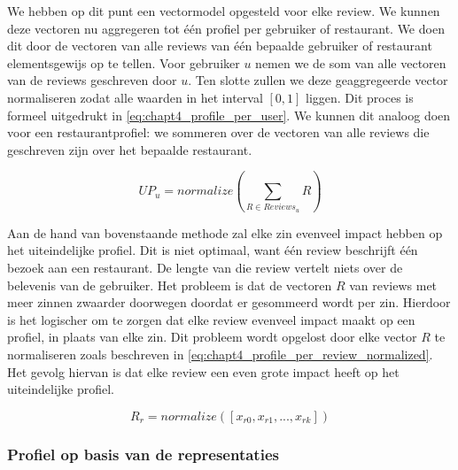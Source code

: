 We hebben op dit punt een vectormodel opgesteld voor elke review. We kunnen deze vectoren nu aggregeren tot één profiel per gebruiker of restaurant. We doen dit door de vectoren van alle reviews van één bepaalde gebruiker of restaurant elementsgewijs op te tellen. Voor gebruiker $u$ nemen we de som van alle vectoren van de reviews geschreven door $u$. Ten slotte zullen we deze geaggregeerde vector normaliseren zodat alle waarden in het interval $[0, 1]$ liggen. Dit proces is formeel uitgedrukt in \autoref{eq:chapt4_profile_per_user}. We kunnen dit analoog doen voor een restaurantprofiel: we sommeren over de vectoren van alle reviews die geschreven zijn over het bepaalde restaurant.

\begin{equation}
\label{eq:chapt4_profile_per_user}
    UP_{u} = normalize(\sum_{R \in Reviews_u}R)
\end{equation}

Aan de hand van bovenstaande methode zal elke zin evenveel impact hebben op het uiteindelijke profiel. Dit is niet optimaal, want één review beschrijft één bezoek aan een restaurant. De lengte van die review vertelt niets over de belevenis van de gebruiker. Het probleem is dat de vectoren $R$ van reviews met meer zinnen zwaarder doorwegen doordat er gesommeerd wordt per zin.\newline
Hierdoor is het logischer om te zorgen dat elke review evenveel impact maakt op een profiel, in plaats van elke zin.  Dit probleem wordt opgelost door elke vector $R$ te normaliseren zoals beschreven in \autoref{eq:chapt4_profile_per_review_normalized}. Het gevolg hiervan is dat elke review een even grote impact heeft op het uiteindelijke profiel.

\begin{equation}
\label{eq:chapt4_profile_per_review_normalized}
    R_r = normalize([x_{r0}, x_{r1}, ..., x_{rk}])
\end{equation}

\subsubsection{Profiel op basis van de representaties}
\label{sub:chapt4_profile_repesentaties}

